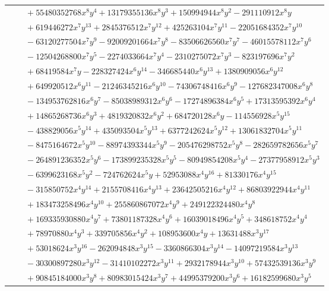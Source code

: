 \documentclass[11pt]{article}
\begin{document}
\begin{longtable}{@{}ll@{}}
 & $\quad +55480352768x^{8}y^{4}+13179355136x^{8}y^{3}+150994944x^{8}y^{2}-291110912x^{8}y$\\
 & $\quad +619446272x^{7}y^{13}+2845376512x^{7}y^{12}+425263104x^{7}y^{11}-22051684352x^{7}y^{10}$\\
 & $\quad -63120277504x^{7}y^{9}-92009201664x^{7}y^{8}-83506626560x^{7}y^{7}-46015578112x^{7}y^{6}$\\
 & $\quad -12504268800x^{7}y^{5}-2274033664x^{7}y^{4}-2310275072x^{7}y^{3}-823197696x^{7}y^{2}$\\
 & $\quad +68419584x^{7}y-228327424x^{6}y^{14}-346685440x^{6}y^{13}+1380909056x^{6}y^{12}$\\
 & $\quad +649920512x^{6}y^{11}-21246345216x^{6}y^{10}-74306748416x^{6}y^{9}-127682347008x^{6}y^{8}$\\
 & $\quad -134953762816x^{6}y^{7}-85038989312x^{6}y^{6}-17274896384x^{6}y^{5}+17313595392x^{6}y^{4}$\\
 & $\quad +14865268736x^{6}y^{3}+4819320832x^{6}y^{2}+684720128x^{6}y-114556928x^{5}y^{15}$\\
 & $\quad -438829056x^{5}y^{14}+435093504x^{5}y^{13}+6377242624x^{5}y^{12}+13061832704x^{5}y^{11}$\\
 & $\quad -8475164672x^{5}y^{10}-88974393344x^{5}y^{9}-205476298752x^{5}y^{8}-282659782656x^{5}y^{7}$\\
 & $\quad -264891236352x^{5}y^{6}-173899235328x^{5}y^{5}-80949854208x^{5}y^{4}-27377958912x^{5}y^{3}$\\
 & $\quad -6399623168x^{5}y^{2}-724762624x^{5}y+52953088x^{4}y^{16}+81330176x^{4}y^{15}$\\
 & $\quad -315850752x^{4}y^{14}+2155708416x^{4}y^{13}+23642505216x^{4}y^{12}+86803922944x^{4}y^{11}$\\
 & $\quad +183473258496x^{4}y^{10}+255860867072x^{4}y^{9}+249122324480x^{4}y^{8}$\\
 & $\quad +169335930880x^{4}y^{7}+73801187328x^{4}y^{6}+16039018496x^{4}y^{5}+348618752x^{4}y^{4}$\\
 & $\quad +78970880x^{4}y^{3}+339705856x^{4}y^{2}+108953600x^{4}y+13631488x^{3}y^{17}$\\
 & $\quad +53018624x^{3}y^{16}-262094848x^{3}y^{15}-3360866304x^{3}y^{14}-14097219584x^{3}y^{13}$\\
 & $\quad -30300897280x^{3}y^{12}-31410102272x^{3}y^{11}+2932178944x^{3}y^{10}+57432539136x^{3}y^{9}$\\
 & $\quad +90845184000x^{3}y^{8}+80983015424x^{3}y^{7}+44995379200x^{3}y^{6}+16182599680x^{3}y^{5}$\\

\end{longtable}
\end{document}
